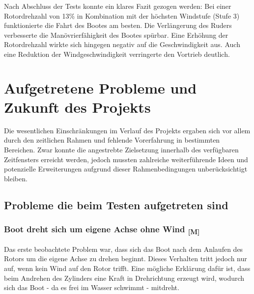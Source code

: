 \documentclass[a4paper,12pt]{article}
\begin{document}
Nach Abschluss der Tests konnte ein klares Fazit gezogen werden: Bei einer Rotordrehzahl von 13\% in Kombination mit der höchsten Windstufe (Stufe 3) funktionierte die Fahrt des Bootes am besten. Die Verlängerung des Ruders verbesserte die Manövrierfähigkeit des Bootes spürbar. Eine Erhöhung der Rotordrehzahl wirkte sich hingegen negativ auf die Geschwindigkeit aus. Auch eine Reduktion der Windgeschwindigkeit verringerte den Vortrieb deutlich.


\newpage


\newpage
\section{Aufgetretene Probleme und Zukunft des Projekts}

Die wesentlichen Einschränkungen im Verlauf des Projekts ergaben sich vor allem durch den zeitlichen Rahmen und fehlende Vorerfahrung in bestimmten Bereichen. Zwar konnte die angestrebte Zielsetzung innerhalb des verfügbaren Zeitfensters erreicht werden, jedoch mussten zahlreiche weiterführende Ideen und potenzielle Erweiterungen aufgrund dieser Rahmenbedingungen unberücksichtigt bleiben.

\subsection{Probleme die beim Testen aufgetreten sind}


\subsubsection{\texorpdfstring{Boot dreht sich um eigene Achse ohne Wind \textsubscript{[M]}}{Boot dreht sich um eigene Achse ohne Wind [M]}}

Das erste beobachtete Problem war, dass sich das Boot nach dem Anlaufen des Rotors um die eigene Achse zu drehen beginnt. Dieses Verhalten tritt jedoch nur auf, wenn kein Wind auf den Rotor trifft. Eine mögliche Erklärung dafür ist, dass beim Andrehen des Zylinders eine Kraft in Drehrichtung erzeugt wird, wodurch sich das Boot - da es frei im Wasser schwimmt - mitdreht.
\end{document}
